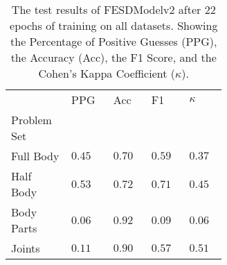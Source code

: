     \begin{table}[!htbp]
        \caption[Test Results of FESDModelv2]{The test results of FESDModelv2 after 22 epochs of training on all datasets. Showing the Percentage of Positive Guesses (PPG), the Accuracy (Acc), the F1 Score, and the Cohen's Kappa Coefficient ($\kappa$).}
        \label{tab:hi_res_v2}
        \centering
        \begin{tabular}{p{0.14\linewidth}p{0.12\linewidth}p{0.12\linewidth}p{0.12\linewidth}p{0.12\linewidth}}
\hline
{} &             PPG &  Acc &               F1 &                        $\kappa$ \\
Problem Set   &       &          &      &           \\
\hline
Full Body   & $0.45$ &	$0.70$ &	$0.59$ &	$0.37$ \\
Half Body   & $0.53$ &	$0.72$ &	$0.71$ &	$0.45$ \\
Body Parts  & $0.06$ &	$0.92$ &	$0.09$ &	$0.06$ \\
Joints      & $0.11$ &	$0.90$ &	$0.57$ &	$0.51$ \\
\hline
\end{tabular}

    \end{table}
  